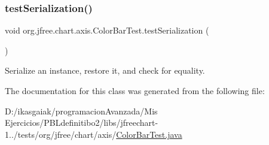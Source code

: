 \subsubsection{\texorpdfstring{test\+Serialization()}{testSerialization()}}
{\footnotesize\ttfamily void org.\+jfree.\+chart.\+axis.\+Color\+Bar\+Test.\+test\+Serialization (\begin{DoxyParamCaption}{ }\end{DoxyParamCaption})}

Serialize an instance, restore it, and check for equality. 

The documentation for this class was generated from the following file\+:\begin{DoxyCompactItemize}
\item 
D\+:/ikasgaiak/programacion\+Avanzada/\+Mis Ejercicios/\+P\+B\+Ldefinitibo2/libs/jfreechart-\/1../tests/org/jfree/chart/axis/\mbox{\hyperlink{_color_bar_test_8java}{Color\+Bar\+Test.\+java}}\end{DoxyCompactItemize}

